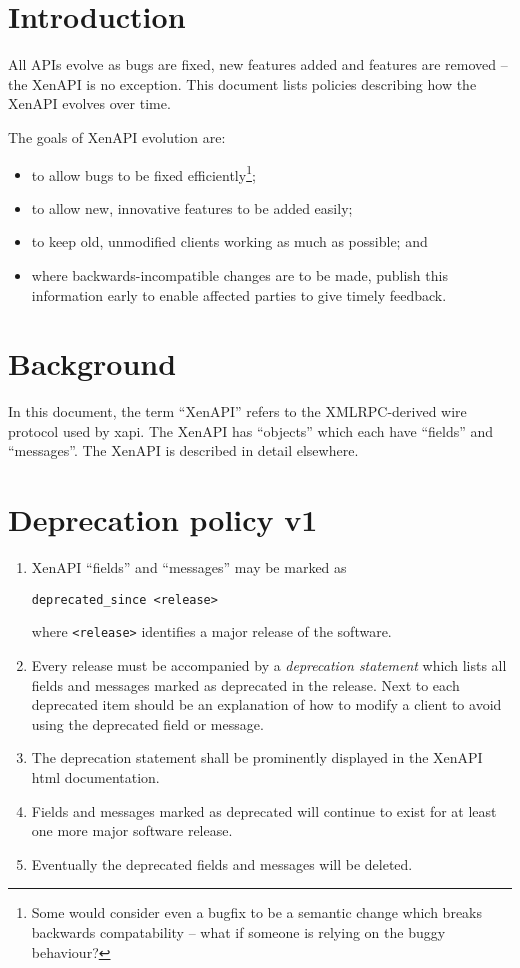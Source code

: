 \documentclass{article}
\begin{document}



\section{Introduction}
All APIs evolve as bugs are fixed, new features added and features are removed -- the XenAPI is no exception. This document lists policies describing how the XenAPI evolves over time.

The goals of XenAPI evolution are:
\begin{itemize}
\item to allow bugs to be fixed efficiently\footnote{Some would consider even a bugfix to be a semantic change which breaks backwards compatability -- what if someone is relying on the buggy behaviour?};
\item to allow new, innovative features to be added easily;
\item to keep old, unmodified clients working as much as possible; and
\item where backwards-incompatible changes are to be made, publish this information early to enable affected parties to give timely feedback.
\end{itemize}

\section{Background}
In this document, the term ``XenAPI'' refers to the XMLRPC-derived wire protocol used by xapi. The XenAPI has ``objects'' which each have ``fields'' and ``messages''. The XenAPI is described in detail elsewhere.

\section{Deprecation policy v1}
\begin{enumerate}

\item XenAPI ``fields'' and ``messages'' may be marked as
\begin{verbatim}
deprecated_since <release>
\end{verbatim}
where \texttt{<release>} identifies a major release of the software.

\item Every release must be accompanied by a {\em deprecation statement} which lists all fields and messages marked as deprecated in the release. Next to each deprecated item should be an explanation of how to modify a client to avoid using the deprecated field or message.

\item The deprecation statement shall be prominently displayed in the XenAPI html documentation.

\item Fields and messages marked as deprecated will continue to exist for at least one more major software release.

\item Eventually the deprecated fields and messages will be deleted.
\end{enumerate}
\end{document}
